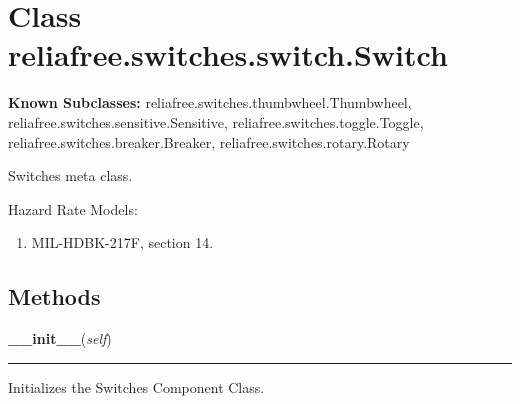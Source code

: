 %
%
%


\section{Class reliafree.switches.switch.Switch}

    \label{reliafree:switches:switch:Switch}
\textbf{Known Subclasses:}
reliafree.switches.thumbwheel.Thumbwheel,
    reliafree.switches.sensitive.Sensitive,
    reliafree.switches.toggle.Toggle,
    reliafree.switches.breaker.Breaker,
    reliafree.switches.rotary.Rotary

Switches meta class.

Hazard Rate Models:

\begin{enumerate}

\setlength{\parskip}{0.5ex}
  \item MIL-HDBK-217F, section 14.

\end{enumerate}



  \subsection{Methods}

    \label{reliafree:switches:switch:Switch:__init__}

    \vspace{0.5ex}

\hspace{.8\funcindent}\begin{boxedminipage}{\funcwidth}

    \raggedright \textbf{\_\_init\_\_}(\textit{self})

    \vspace{-1.5ex}

    \rule{\textwidth}{0.5\fboxrule}
\setlength{\parskip}{2ex}
    Initializes the Switches Component Class.

\setlength{\parskip}{1ex}
    \end{boxedminipage}


